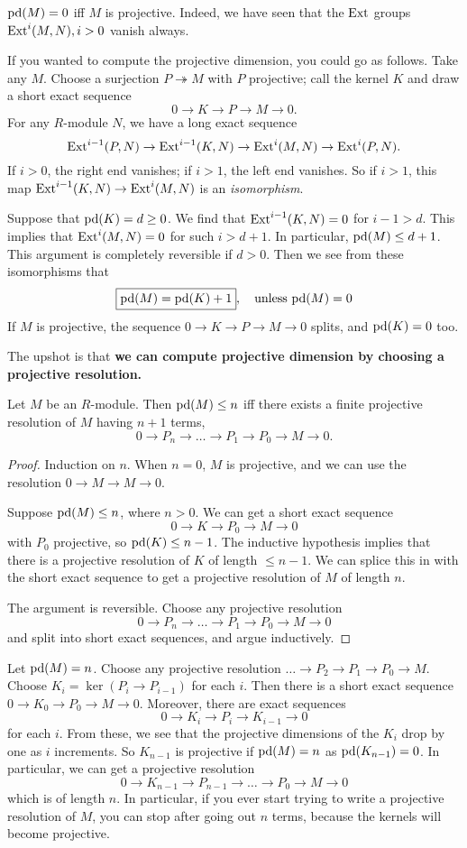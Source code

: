 \begin{remark} 
$\mathrm{pd}(M) = 0$ iff $M$ is projective. Indeed, we have seen that
the $\mathrm{Ext}$ groups
$\mathrm{Ext}^i(M,N), i >0$
vanish always.
\end{remark} 

If you wanted to compute the projective dimension, you could go
as follows.
Take any $M$. Choose a surjection $P \twoheadrightarrow M$ with
$P$ projective;
call the kernel $K$ and draw a short exact sequence
\[ 0 \to K \to P \to M \to 0.  \]
For any $R$-module $N$, we have a long exact sequence
\[ \mathrm{Ext}^{i-1}(P,N) \to \mathrm{Ext}^{i-1}(K,N) \to \mathrm{Ext}^i(M,N) \to
\mathrm{Ext}^i(P, N). \]
If $i >0$, the right end vanishes; if $i >1$, the left end
vanishes. So if $i
>1$, this map $\mathrm{Ext}^{i-1}(K,N) \to \mathrm{Ext}^i(M,N)$ is an
\emph{isomorphism}.

Suppose that $\mathrm{pd}(K) = d \geq 0$. We find that
$\mathrm{Ext}^{i-1}(K,N)=0$ for $i-1
> d$.  
This implies that $\mathrm{Ext}^i(M,N) = 0$ for such $i > d+1$. In
particular, $\mathrm{pd}(M)
\leq d+1$.
This argument is completely reversible if $d >0$.
Then we see from these isomorphisms that
\[ \boxed{\mathrm{pd}(M) = \mathrm{pd}(K)+1}, \quad \mathrm{unless} \ \mathrm{pd}(M)=0
\]
If $M$ is projective, the sequence $0 \to K \to P \to M \to 0$
splits, and
$\mathrm{pd}(K)=0$ too.

The upshot is that \textbf{we can compute projective dimension
by choosing a
projective resolution.}
\begin{proposition} 
Let $M$ be an $R$-module. Then $\mathrm{pd}(M) \leq n$ iff there exists
a finite
projective resolution of $M$ having $n+1$ terms, 
\[ 0 \to P_n \to \dots \to P_1 \to P_0 \to M \to 0.  \]
\end{proposition} 
\begin{proof} 
Induction on $n$. When $n = 0$, $M$ is projective, and we can
use the
resolution $0 \to M \to M \to 0$.

Suppose $\mathrm{pd}(M) \leq n$, where $n >0$. We can get a short exact
sequence
\[ 0 \to K \to P_0 \to M \to 0  \]
with $P_0$ projective, so $\mathrm{pd}(K) \leq n-1$. The inductive
hypothesis implies
that there is a projective resolution of $K$ of length $\leq
n-1$. We can
splice this in with the short exact sequence to get a projective
resolution of
$M$ of length $n$.

The argument is reversible. Choose any projective resolution
\[  0 \to P_n \to \dots \to P_1 \to P_0 \to M \to 0 \]
and split into short exact sequences, and argue inductively.
\end{proof} 


Let $\mathrm{pd}(M) = n$. Choose any projective resolution $\dots \to
P_2 \to P_1 \to
P_0 \to M$. Choose $K_i = \ker(P_i \to P_{i-1})$ for each $i$. 
Then there is a short exact sequence $0 \to K_0 \to P_0 \to M
\to 0$. Moreover,
there are exact sequences
\[ 0 \to K_i \to P_i \to K_{i-1} \to 0  \]
for each $i$. From these, we see that the projective dimensions
of the $K_i$
drop by one as $i$ increments. So $K_{n-1}$ is projective if
$\mathrm{pd}(M) = n$ as
$\mathrm{pd}(K_{n-1})=0$. In particular, we can get a projective
resolution
\[ 0 \to K_{n-1} \to P_{n-1} \to \dots \to P_0 \to M \to 0  \]
which is of length $n$. 
In particular, if you ever start trying to write a projective
resolution of
$M$, you can stop after going out $n$ terms, because the kernels
will become
projective.


